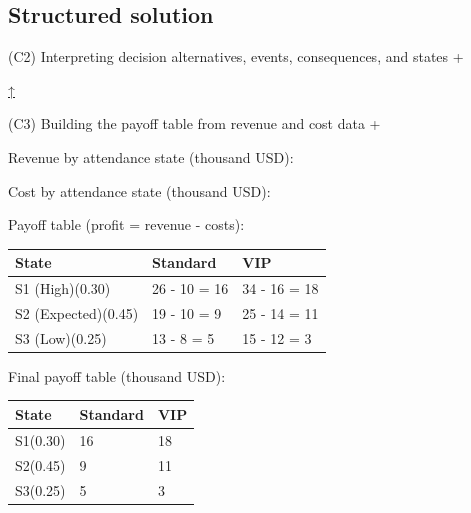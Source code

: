 \documentclass[11pt]{article}
\begin{document}
	\label{problem2-solution}\label{problem2-criteria}
	
	\subsection*{Structured solution}
	
	
	
	
	
	(C2) Interpreting decision alternatives, events, consequences, and states
	+
	
	
	
	
	
	\hyperref[problem2-criteria]{↑}
	
	
	
	
	(C3) Building the payoff table from revenue and cost data
	+
	
	
	Revenue by attendance state (thousand USD):
	
	Cost by attendance state (thousand USD):
	
	Payoff table (profit = revenue - costs):
	\begin{center}
		\begin{tabular}{lll}
			\toprule
			State & Standard & VIP \\
			\midrule
			S1 (High)\newline (0.30) & 26 - 10 = 16 & 34 - 16 = 18 \\
			S2 (Expected)\newline (0.45) & 19 - 10 = 9 & 25 - 14 = 11 \\
			S3 (Low)\newline (0.25) & 13 - 8 = 5 & 15 - 12 = 3 \\
			\bottomrule
		\end{tabular}
	\end{center}
	
	
	Final payoff table (thousand USD):
	\begin{center}
		\begin{tabular}{lll}
			\toprule
			State & Standard & VIP \\
			\midrule
			S1\newline (0.30) & 16 & 18 \\
			S2\newline (0.45) & 9 & 11 \\
			S3\newline (0.25) & 5 & 3 \\
			\bottomrule
		\end{tabular}
	\end{center}
	
\end{document}
